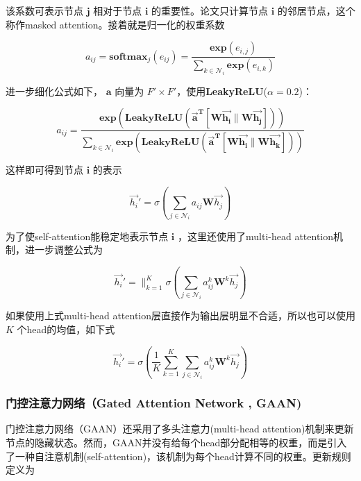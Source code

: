 \documentclass[UTF8]{ctexart}
\begin{document}
该系数可表示节点 $\mathbf{j}$ 相对于节点 $\mathbf{i}$ 的重要性。论文只计算节点 $\mathbf{i}$ 的邻居节点，这个称作masked attention。接着就是归一化的权重系数 

\begin{equation} 
a_{ij}=\mathbf{softmax}_j(e_{ij})=\frac{\mathbf{exp}(e_{i,j})}{\sum_{k \in \mathcal{N}_i}\mathbf{exp}(e_{i,k})}
\end{equation}

进一步细化公式如下， $\mathbf{a}$ 向量为 $F' \times F'$，使用\textbf{LeakyReLU}($\alpha = 0.2$)：

\begin{equation} 
a_{ij}=\frac{\mathbf{exp}(\mathbf{LeakyReLU(\overrightarrow{\mathbf{a}}^T[\mathbf{W}\overrightarrow{h_i} \parallel \mathbf{W}\overrightarrow{h_j}])})}{\sum_{k \in \mathcal{N}_i} \mathbf{exp}(\mathbf{LeakyReLU(\overrightarrow{\mathbf{a}}^T[\mathbf{W}\overrightarrow{h_i} \parallel \mathbf{W}\overrightarrow{h_k}])})}
\end{equation}

这样即可得到节点 $\textbf{i}$ 的表示

\begin{equation} 
\overrightarrow{h_i}' = \sigma (\sum_{j \in \mathcal{N}_i} a_{ij} \mathbf{W}\overrightarrow{h_j})
\end{equation}

为了使self-attention能稳定地表示节点 $\mathbf{i}$ ，这里还使用了multi-head attention机制，进一步调整公式为

\begin{equation} 
\overrightarrow{h_i}' = \parallel_{k=1}^{K} \sigma (\sum_{j \in \mathcal{N}_i} a_{ij}^{k} \mathbf{W}^{k} \overrightarrow{h_j})
\end{equation}

如果使用上式multi-head attention层直接作为输出层明显不合适，所以也可以使用$K$ 个head的均值，如下式

\begin{equation} 
\overrightarrow{h_i}' = \sigma (\frac{1}{K} \sum_{k=1}^{K} \sum_{j \in \mathcal{N}_i} a_{ij}^{k} \mathbf{W}^{k} \overrightarrow{h_j})
\end{equation}

\subsubsection{门控注意力网络（Gated Attention Network , GAAN)}

门控注意力网络（GAAN）还采用了多头注意力(multi-head attention)机制来更新节点的隐藏状态。然而，GAAN并没有给每个head部分配相等的权重，而是引入了一种自注意机制(self-attention)，该机制为每个head计算不同的权重。更新规则定义为
\end{document}
